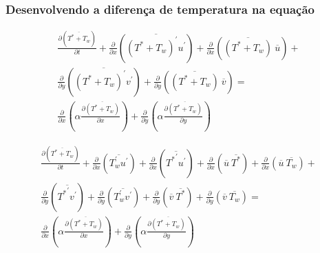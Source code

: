 \documentclass[xcolor=dvipsnames,10pt,aspectratio=169]{beamer}
\begin{document}
		
		\begin{frame}
		\frametitle{Desenvolvendo a diferença de temperatura na equação}
		\begin{equation}
		\begin{split}
		\frac{\partial ( \overline{T^\ast + T_w}  ) }{\partial t} +
		\frac{\partial{}}{\partial{x}} \left(\overline{(T^\ast + T_w)^\prime u^\prime}\right) + \frac{\partial{}}{\partial{x}}\left(\overline{(T^\ast + T_w)} \ \overline{u}\right)+  \\
		\frac{\partial{}}{\partial{y}} \left(\overline{(T^\ast + T_w)^\prime v^\prime}\right) + \frac{\partial{}}{\partial{y}}\left(\overline{(T^\ast + T_w)} \ \overline{v}\right) = \\
		{\frac{\partial{}}{\partial{x}}} \left(\alpha {\frac{\partial{\overline{(T^\ast + T_w)}}}{\partial{x}}} \right) +
		{\frac{\partial{}}{\partial{y}}} \left(\alpha {\frac{\partial{\overline{(T^\ast + T_w)}}}{\partial{y}}} \right) 
		\end{split}
		\end{equation}
		\begin{center}\begin{equation}\begin{split}
		\frac{\partial ( \overline{ T^\ast + T_w } ) }{\partial t} +
		\frac{\partial{}}{\partial{x}} \left(\overline{T_w^{\prime} u^{\prime}}\right) +\frac{\partial{}}{\partial{x}} \left(\overline{{T^{\ast}}^{\prime} u^{\prime}}\right)
		+\frac{\partial{}}{\partial{x}}\left(\overline{u} \ \overline{T^{\ast}}\right)+ 
		\frac{\partial{}}{\partial{x}}\left(\overline{u} \ \overline{T_w}\right)+ 
		\\
		\frac{\partial{}}{\partial{y}} \left(\overline{{T^{\ast}}^{\prime} v^{\prime}}\right)+
		\frac{\partial{}}{\partial{y}} \left(\overline{T_w^\prime v^\prime}\right) + \frac{\partial{}}{\partial{y}}\left(\overline{v} \ \overline{T^\ast}\right) +
		\frac{\partial{}}{\partial{y}}\left(\overline{v} \ \overline{T_w}\right) 
		= 
		\\
		{\frac{\partial{}}{\partial{x}}} \left(\alpha {\frac{\partial{\overline{(T^\ast + T_w)}}}{\partial{x}}} \right) +
		{\frac{\partial{}}{\partial{y}}} \left(\alpha {\frac{\partial{\overline{(T^\ast + T_w)}}}{\partial{y}}} \right) 
		\end{split}\end{equation}\end{center}
		\end{frame}
		
		
		
		
		
\end{document}
